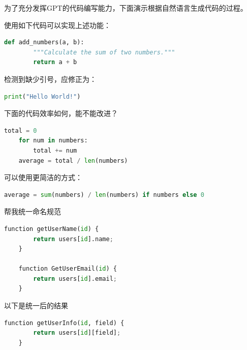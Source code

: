 为了充分发挥GPT的代码编写能力，下面演示根据自然语言生成代码的过程。


\begin{gptbox}
\footnotesize{使用如下代码可以实现上述功能：}
\small{
\begin{lstlisting}[language=Python]
    def add_numbers(a, b):
        """Calculate the sum of two numbers."""
        return a + b
\end{lstlisting}
}
\end{gptbox}


\begin{gptbox}
\footnotesize{检测到缺少引号，应修正为：}
\small{
\begin{lstlisting}[language=Python]
    print("Hello World!")
\end{lstlisting}
}
\end{gptbox}


\begin{promptbox}
\footnotesize{下面的代码效率如何，能不能改进？}
\small{
\begin{lstlisting}[language=Python]
    total = 0
    for num in numbers:
        total += num
    average = total / len(numbers)
\end{lstlisting}}
\end{promptbox}

\begin{gptbox}
\footnotesize{可以使用更简洁的方式：}
\small{
\begin{lstlisting}[language=Python]
    average = sum(numbers) / len(numbers) if numbers else 0
\end{lstlisting}
}
\end{gptbox}



\begin{promptbox}
\footnotesize{帮我统一命名规范}
\small{
\begin{lstlisting}[language=Python]
    function getUserName(id) {
        return users[id].name;
    }
    
    function GetUserEmail(id) {
        return users[id].email;
    }
\end{lstlisting}}
\end{promptbox}

\begin{gptbox}
\footnotesize{以下是统一后的结果}
\small{
\begin{lstlisting}[language=Python]
    function getUserInfo(id, field) {
        return users[id][field];
    }
\end{lstlisting}
}
\end{gptbox}

